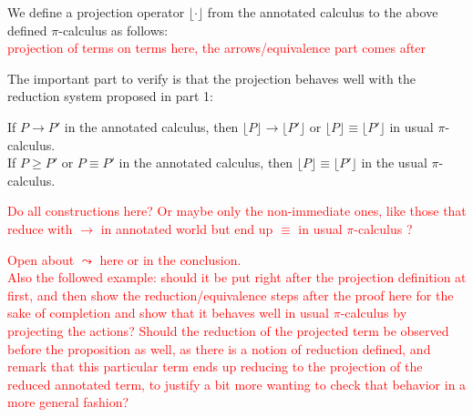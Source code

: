 \begin{definition}
We define a projection operator $\lfloor\cdot\rfloor$ from the annotated calculus to the above defined $\pi$-calculus as follows:\\
\textcolor{red}{projection of terms on terms here, the arrows/equivalence part comes after}
\end{definition}

The important part to verify is that the projection behaves well with the reduction system proposed in part 1:

\begin{proposition}
If $P \to P'$ in the annotated calculus, then $\lfloor P \rfloor \to \lfloor P' \rfloor$ or $\lfloor P \rfloor \equiv \lfloor P' \rfloor$ in usual $\pi$-calculus.\\
If $P \geq P'$ or $P \equiv P'$ in the annotated calculus, then $\lfloor P \rfloor \equiv \lfloor P' \rfloor$ in the usual $\pi$-calculus.
\end{proposition}

\begin{myproof}
\textcolor{red}{Do all constructions here? Or maybe only the non-immediate ones, like those that reduce with $\to$ in annotated world but end up $\equiv$ in usual $\pi$-calculus ?} %
\end{myproof}

\textcolor{red}{Open about $\leadsto$ here or in the conclusion.\\
Also the followed example: should it be put right after the projection definition at first, and then show the reduction/equivalence steps after the proof here for the sake of completion and show that it behaves well in usual $\pi$-calculus by projecting the actions? Should the reduction of the projected term be observed before the proposition as well, as there is a notion of reduction defined, and remark that this particular term ends up reducing to the projection of the reduced annotated term, to justify a bit more wanting to check that behavior in a more general fashion?} %